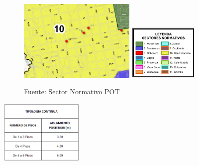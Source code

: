 \documentclass[12pt,a4paper,twoside]{article}
\begin{document}
{\begin{figure}[!h]
	\centering
	\includegraphics[width=0.5\textwidth]{Norma/sectornormativo}
	\includegraphics[width=0.3\textwidth]{Norma/sectornormativo1}
	\caption{Fuente: Sector Normativo POT}
	\label{fig:tratamiento}
\end{figure}

\begin{center}
	\includegraphics[width=0.3\textwidth]{Norma/Edificabilidad4}
\end{center}



\begin{center}
\end{center}



}
\end{document}
